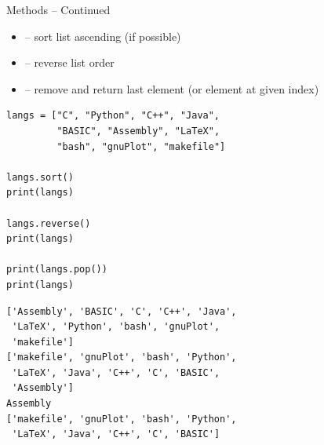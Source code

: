 \begin{frame}[fragile]{Methods -- Continued}
%
\vspace{-3pt}
\begin{itemize}
\item {} -- sort list ascending (if possible)
\item {} -- reverse list order
\item {} -- remove and return last element (or element at given index)
\end{itemize}
%
\begin{tcbraster}[raster columns=2,
                  raster equal height,
                  nobeforeafter,
                  raster column skip=0.5cm]
\begin{codebox}
\begin{verbatim}
langs = ["C", "Python", "C++", "Java",
         "BASIC", "Assembly", "LaTeX",
         "bash", "gnuPlot", "makefile"]

langs.sort()
print(langs)

langs.reverse()
print(langs)

print(langs.pop())
print(langs)
\end{verbatim}
\end{codebox}
%
\begin{cmdbox}
\begin{verbatim}
['Assembly', 'BASIC', 'C', 'C++', 'Java', 
 'LaTeX', 'Python', 'bash', 'gnuPlot', 
 'makefile']
['makefile', 'gnuPlot', 'bash', 'Python',
 'LaTeX', 'Java', 'C++', 'C', 'BASIC',
 'Assembly']
Assembly
['makefile', 'gnuPlot', 'bash', 'Python',
 'LaTeX', 'Java', 'C++', 'C', 'BASIC']

\end{verbatim}
\end{cmdbox}
\end{tcbraster}
%
\end{frame}